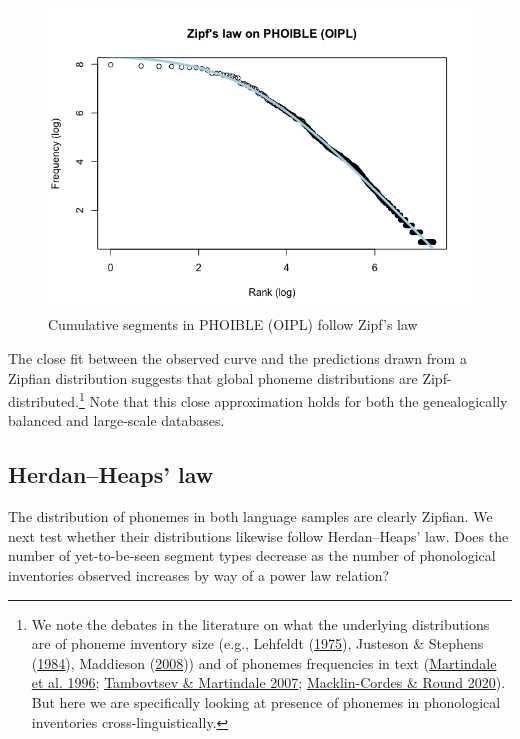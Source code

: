 \documentclass[
]{article}
\begin{document}
\begin{figure}

{\centering \includegraphics[width=0.8\linewidth]{README_files/figure-gfm/zipf_distribution_phoible-1} 

}

\caption{Cumulative segments in PHOIBLE (OIPL) follow Zipf's law}\label{fig:phoible_zipf}
\end{figure}

The close fit between the observed curve and the predictions drawn from
a Zipfian distribution suggests that global phoneme distributions are
Zipf-distributed.\footnote{We note the debates in the literature on what
  the underlying distributions are of phoneme inventory size (e.g.,
  Lehfeldt (\protect\hyperlink{ref-Lehfeldt1975}{1975}), Justeson \&
  Stephens (\protect\hyperlink{ref-JustesonStephens1984}{1984}),
  Maddieson (\protect\hyperlink{ref-Maddieson2008}{2008})) and of
  phonemes frequencies in text
  (\protect\hyperlink{ref-Martindale_etal1996}{Martindale et al. 1996};
  \protect\hyperlink{ref-TambovtsevMartindale2007}{Tambovtsev \&
  Martindale 2007};
  \protect\hyperlink{ref-Macklin-CordesRound2020}{Macklin-Cordes \&
  Round 2020}). But here we are specifically looking at presence of
  phonemes in phonological inventories cross-linguistically.} Note that
this close approximation holds for both the genealogically balanced and
large-scale databases.

\hypertarget{herdanheaps-law}{%
\subsection{Herdan--Heaps' law}\label{herdanheaps-law}}

The distribution of phonemes in both language samples are clearly
Zipfian. We next test whether their distributions likewise follow
Herdan--Heaps' law. Does the number of yet-to-be-seen segment types
decrease as the number of phonological inventories observed increases by
way of a power law relation?
\end{document}
